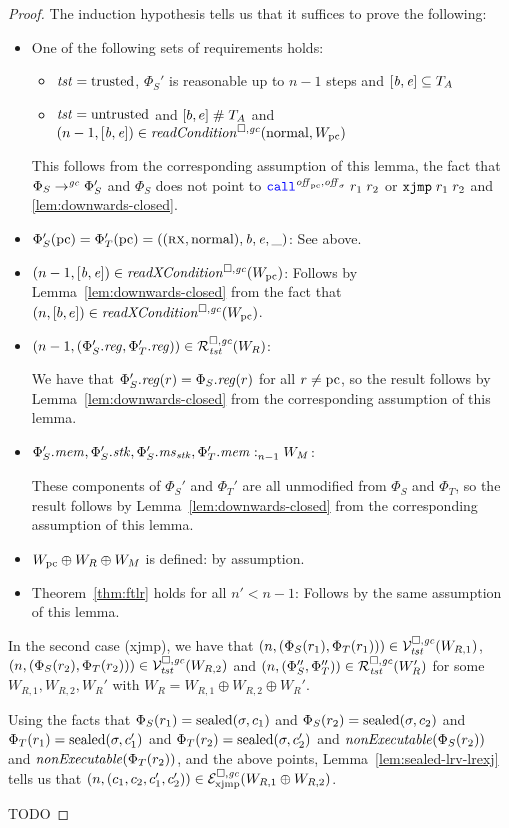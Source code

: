 \begin{proof}
  The induction hypothesis tells us that it suffices to prove the following:
  \begin{itemize}
  \item One of the following sets of requirements holds:
    \begin{itemize}
    \item $\trust = \trusted$, $\Phi_S'$ is reasonable up to $n-1$ steps and $[\baddr,\eaddr] \subseteq \ta$
    \item $\trust = \untrusted$ and $[b,e] \mathrel{\#} \ta$ and $\npair[n-1]{[\baddr,\eaddr]} \in \readCond{\normal,W_\pcreg}$
    \end{itemize}
    This follows from the corresponding assumption of this lemma, the fact that $\Phi_S \step[\gc] \Phi_S'$ and $\Phi_S$ does not point to $\scall{\offpc,\offsigma}{r_1}{r_2}$ or $\txjmp{r_1}{r_2}$ and \ref{lem:downwards-closed}.
  \item $\Phi_S'(\pcreg) = \Phi_T'(\pcreg) = ((\rx,\normal),\baddr,\eaddr,\_)$:
    See above.
  \item $\npair[n-1]{[\baddr,\eaddr]} \in \xReadCond{W_\pcreg}$:
    Follows by Lemma~\ref{lem:downwards-closed} from the fact that $\npair{[b,e]} \in \xReadCond{W_\pcreg}$.
  \item $\npair[n-1]{(\Phi_S'.\reg,\Phi_T'.\reg)} \in \lrrg{\trust}(W_R)$:

    We have that $\Phi_S'.\reg(r) = \Phi_S.\reg(r)$ for all $r \neq \pcreg$, so the result follows by Lemma~\ref{lem:downwards-closed} from the corresponding assumption of this lemma.

  \item $\memSat[n-1]{\Phi_S'.\mem,\Phi_S'.\stk,\Phi_S'.\ms_\stk,\Phi_T'.\mem}{W_M}$:

    These components of $\Phi_S'$ and $\Phi_T'$ are all unmodified from $\Phi_S$ and $\Phi_T$, so the result follows by Lemma~\ref{lem:downwards-closed} from the corresponding assumption of this lemma.

  \item $W_\pcreg \oplus W_R \oplus W_M$ is defined: by assumption.

  \item Theorem~\ref{thm:ftlr} holds for all $n' < n-1$:
    Follows by the same assumption of this lemma.
  \end{itemize}

  In the second case (xjmp), we have that $\npair{(\Phi_S(r_1),\Phi_T(r_1))} \in \lrvg{\trust}(W_{R,1})$, $\npair{(\Phi_S(r_2),\Phi_T(r_2))} \in \lrvg{\trust}(W_{R,2})$ and $\npair{(\Phi_S'',\Phi_T'')} \in \lrrg{\trust}(W_R')$ for some $W_{R,1}, W_{R,2}, W_R'$ with $W_R = W_{R,1} \oplus W_{R,2} \oplus W_R'$.

  Using the facts that $\Phi_S(r_1) = \sealed{\sigma,c_1}$ and $\Phi_S(r_2) = \sealed{\sigma,c_2}$ and $\Phi_T(r_1) = \sealed{\sigma,c_1'}$ and $\Phi_T(r_2) = \sealed{\sigma,c_2'}$ and $\nonExec{\Phi_S(r_2)}$ and $\nonExec{\Phi_T(r_2)}$, and the above points, Lemma~\ref{lem:sealed-lrv-lrexj} tells us that $\npair{(c_1,c_2,c_1',c_2')} \in \lrexj(W_{R,1} \oplus W_{R,2})$. 

  TODO
\end{proof}

